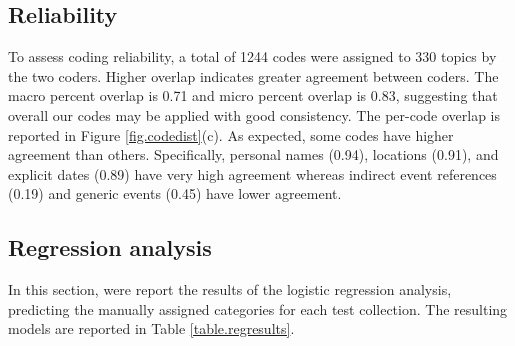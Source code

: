 \documentclass[runningheads,a4paper]{llncs}
\begin{document}
\subsection{Reliability}

To assess coding reliability, a total of 1244 codes were assigned to 330 topics by the two coders. Higher overlap indicates greater agreement between coders. The macro percent overlap is 0.71 and  micro percent overlap is 0.83, suggesting that overall our codes may be applied with good consistency. The per-code overlap is reported in Figure \ref{fig.codedist}(c). As expected, some codes have higher agreement than others. Specifically, personal names (0.94), locations (0.91), and explicit dates (0.89) have very high agreement whereas indirect event references (0.19) and generic events (0.45) have lower agreement.



\subsection{Regression analysis}

In this section, were report the results of the logistic regression analysis, predicting the manually assigned categories for each test collection. The resulting models are reported in Table \ref{table.regresults}. 

\begin{table}
\caption{Logistic regression models for each test collection without and with (Rel) ACF/DPS predictors. Model fit reported based pseudo-$R^2$ after stepwise variable selection based on AIC. Variable significance indicated by $p < 0.05 (^\circ),  < 0.01 (^\vartriangle),  < 0.001 (^\blacktriangle)$ }
\label{table.regresults}
\end{table}
\end{document}
